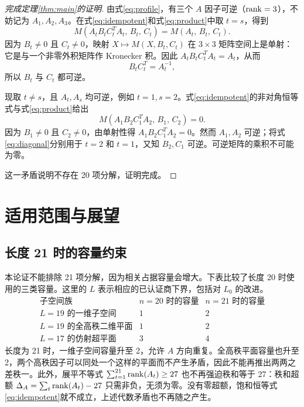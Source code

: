 \documentclass[11pt,a4paper]{article}
\begin{document}
\begin{proof}[完成定理\ref{thm:main}的证明]
  由式\eqref{eq:profile}，有三个 $A$ 因子可逆（$\operatorname{rank}=3$），不妨记为 $A_1,A_2,A_3$。在式\eqref{eq:idempotent}和式\eqref{eq:product}中取 $t=s$，得到
  \[
    M(A_tB_tC_t^TA_t,\,B_t,\,C_t)=M(A_t,\,B_t,\,C_t).
  \]
  因为 $B_t\ne0$ 且 $C_t\ne0$，映射 $X\mapsto M(X,B_t,C_t)$ 在 $3\times3$ 矩阵空间上是单射：它是与一个非零外积矩阵作 Kronecker 积。因此 $A_tB_tC_t^TA_t=A_t$，从而
  \begin{equation}\label{eq:diagonal}
    B_tC_t^T=A_t^{-1},
  \end{equation}
  所以 $B_t$ 与 $C_t$ 都可逆。

  现取 $t\ne s$，且 $A_t,A_s$ 均可逆，例如 $t=1,s=2$。式\eqref{eq:idempotent}的非对角恒等式与式\eqref{eq:product}给出
  \begin{equation}\label{eq:off-diagonal-zero}
    M(A_1B_2C_1^TA_2,\,B_1,\,C_2)=0.
  \end{equation}
  因为 $B_1\ne0$ 且 $C_2\ne0$，由单射性得 $A_1B_2C_1^TA_2=0$。然而 $A_1,A_2$ 可逆；将式\eqref{eq:diagonal}分别用于 $t=2$ 和 $t=1$，又知 $B_2,C_1$ 可逆。可逆矩阵的乘积不可能为零。

  这一矛盾说明不存在 20 项分解，证明完成。
\end{proof}

\section{适用范围与展望}\label{sec:outlook}

\subsection{长度 21 时的容量约束}

本论证不能排除 21 项分解，因为相关占据容量会增大。下表比较了长度 20 时使用的三类容量。这里的 $L$ 表示相应的已认证商下界，包括对 $L_0$ 的改进。
\[
  \begin{array}{c|cc}
    \text{子空间族}&n=20\text{ 时的容量}&n=21\text{ 时的容量}\\\hline
    L=19\text{ 的一维子空间}&1&2\\
    L=19\text{ 的全高秩二维平面}&1&2\\
    L=17\text{ 的仿射超平面}&3&4
  \end{array}
\]
长度为 21 时，一维子空间容量升至 2，允许 $A$ 方向重复。全高秩平面容量也升至 2，两个高秩因子可以同处一个这样的平面而不产生矛盾，因此不能再推出两两之差秩一。此外，展平不等式 $\sum_{t=1}^{21}\operatorname{rank}(A_t)\ge27$ 也不再强迫秩和等于 27：秩和超额 $\Delta_A=\sum_t\operatorname{rank}(A_t)-27$ 只需非负，无须为零。没有零超额，饱和恒等式\eqref{eq:idempotent}就不成立，上述代数矛盾也不再随之产生。
\end{document}
